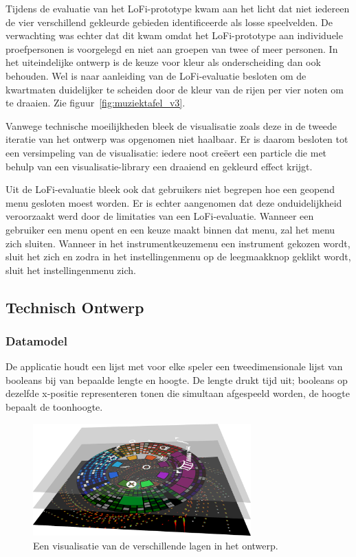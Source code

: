 \documentclass{acm}
\begin{document}
Tijdens de evaluatie van het LoFi-prototype kwam aan het licht dat niet iedereen de vier verschillend gekleurde gebieden identificeerde als losse speelvelden. De verwachting was echter dat dit kwam omdat het LoFi-prototype aan individuele proefpersonen is voorgelegd en niet aan groepen van twee of meer personen. In het uiteindelijke ontwerp is de keuze voor kleur als onderscheiding dan ook behouden. Wel is naar aanleiding van de LoFi-evaluatie besloten om de kwartmaten duidelijker te scheiden door de kleur van de rijen per vier noten om te draaien. Zie figuur~\ref{fig:muziektafel_v3}.

Vanwege technische moeilijkheden bleek de visualisatie zoals deze in de tweede iteratie van het ontwerp was opgenomen niet haalbaar. Er is daarom besloten tot een versimpeling van de visualisatie: iedere noot creëert een particle die met behulp van een visualisatie-library een draaiend en gekleurd effect krijgt.

Uit de LoFi-evaluatie bleek ook dat gebruikers niet begrepen hoe een geopend menu gesloten moest worden. Er is echter aangenomen dat deze onduidelijkheid veroorzaakt werd door de limitaties van een LoFi-evaluatie. Wanneer een gebruiker een menu opent en een keuze maakt binnen dat menu, zal het menu zich sluiten. Wanneer in het instrumentkeuzemenu een instrument gekozen wordt, sluit het zich en zodra in het instellingenmenu op de leegmaakknop geklikt wordt, sluit het instellingenmenu zich.

\subsection{Technisch Ontwerp}
\subsubsection{Datamodel}
De applicatie houdt een lijst met voor elke speler een tweedimensionale lijst van booleans bij van bepaalde lengte en hoogte. De lengte drukt tijd uit; booleans op dezelfde x-positie representeren tonen die simultaan afgespeeld worden, de hoogte bepaalt de toonhoogte. 

\begin{figure}
  \includegraphics[width=84mm]{img/muziektafel_layers}
  \caption{Een visualisatie van de verschillende lagen in het ontwerp.}
  \label{fig:muziektafel_layers}
\end{figure}
\end{document}
